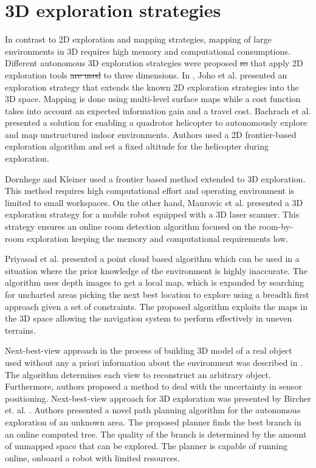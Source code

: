 \section{3D exploration strategies}

In contrast to 2D exploration and mapping strategies, mapping of large environments in 3D requires high memory and computational consumptions. 
Different autonomous 3D exploration strategies were proposed \st{so} that {\color{red}apply} 2D exploration tools \st{are used}  to three dimensions. In \cite{Joho2007}, Joho et al. presented an exploration strategy that extends the known 2D exploration strategies into the 3D space. Mapping is done using multi-level surface maps while a cost function takes
into account an expected information gain and a travel cost. 
Bachrach et
al. \cite{Bachrach2009} presented a solution for enabling a quadrotor helicopter to autonomously explore and map unstructured indoor environments. Authors used a 2D frontier-based exploration algorithm and set a fixed altitude for the helicopter during exploration.  

Dornhege and Kleiner \cite{Dornhege2013} used a frontier based method extended to 3D exploration. This method requires high computational effort and operating environment is limited to small workspaces. On the other hand, Maurovic et al. \cite{Maurovic2014} presented a 3D exploration strategy for a mobile robot equipped with a 3D laser scanner. This strategy ensures an online room detection algorithm focused on the room-by-room exploration keeping the memory and computational requirements low.

Priyasad et al. \cite{Priyasad2018} presented a point cloud based algorithm which can be used in a situation where the prior knowledge of the environment is highly inaccurate. The algorithm uses depth images to get a local map, which is expanded by searching for uncharted areas picking the next best
location to explore using a breadth first approach given a set of
constraints. The proposed algorithm exploits the maps in the 3D
space allowing the navigation system to perform effectively in uneven terrains. 

Next-best-view approach in the process of building 3D model of a real object used without any a priori information about the environment was described in \cite{VasquezGomez2014}. The algorithm determines each view to reconstruct an arbitrary object. Furthermore, authors proposed a method to deal with the uncertainty in sensor positioning.
Next-best-view approach for 3D exploration was presented by Bircher et. al. \cite{Bircher2016}. Authors presented a novel path planning algorithm for the autonomous exploration of an unknown area. The proposed planner finds the best branch in an online computed tree. The quality of the branch is determined by the amount of unmapped space that can be explored. The planner is capable of running online, onboard a robot with limited resources.

